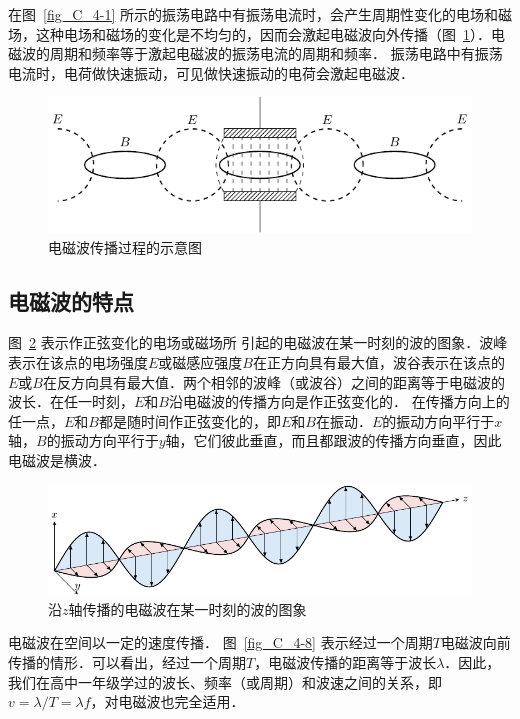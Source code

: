 在图~\ref{fig_C_4-1} 所示的振荡电路中有振荡电流时，会产生周期性变化的电场和磁场，这种电场和磁场的变化是不均匀的，因而会激起电磁波向外传播（图~\ref{fig_C_4-6}）．电磁波的周期和频率等于激起电磁波的振荡电流的周期和频率．
振荡电路中有振荡
电流时，电荷做快速振动，可见做快速振动的电荷会激起电磁波．
\begin{figure}[htbp]
	\centering
	\includegraphics{fig/C/4-6.pdf}
	\caption{电磁波传播过程的示意图}\label{fig_C_4-6}
\end{figure}


\subsection{电磁波的特点}


图~\ref{fig_C_4-7} 表示作正弦变化的电场或磁场所
引起的电磁波在某一时刻的波的图象．波峰表示在该点的电场强度$E$或磁感应强度$B$在正方向具有最大值，波谷表示在该点的$E$或$B$在反方向具有最大值．两个相邻的波峰（或波谷）之间的距离等于电磁波的波长．在任一时刻，$E$和$B$沿电磁波的传播方向是作正弦变化的．
在传播方向上的任一点，$E$和$B$都是随时间作正弦变化的，即$E$和$B$在振动．$E$的振动方向平行于$x$轴，$B$的振动方向平行于$y$轴，它们彼此垂直，而且都跟波的传播方向垂直，因此电磁波是横波．

\begin{figure}[htbp]
	\centering
	\includegraphics{fig/C/4-7.pdf}
	\caption{沿$z$轴传播的电磁波在某一时刻的波的图象}\label{fig_C_4-7}
\end{figure}




电磁波在空间以一定的速度传播．
图~\ref{fig_C_4-8} 表示经过一个周期$T$电磁波向前传播的情形．可以看出，经过一个周期$T$，电磁波传播的距离等于波长$\lambda$．因此，我们在高中一年级学过的波长、频率（或周期）和波速之间的关系，即$v=\lambda/T=\lambda f$，对电磁波也完全适用．

